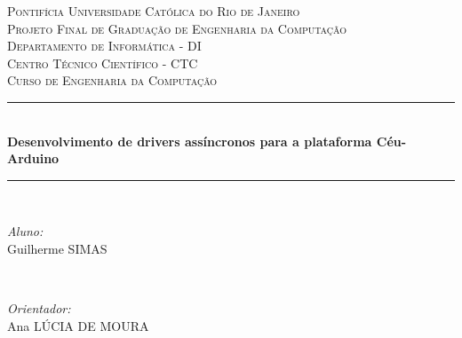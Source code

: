 \documentclass[11pt]{article}
\newcommand\textucsc[1]{\textsc{\MakeUppercase{#1}}}
\begin{document}

\begin{titlepage}

\newcommand{\HRule}{\rule{\linewidth}{0.5mm}} %

\center %
 

\textsc{\LARGE Pontifícia Universidade Católica do Rio de Janeiro}\\[1.5cm] %
\textsc{\Large Projeto Final de Graduação de Engenharia da Computação}\\[0.5cm] %

\textsc{\large Departamento de Informática - DI \\ Centro Técnico Científico - CTC \\ Curso de Engenharia da Computação}\\[0.5cm] %



\newcommand{\titlename}{Desenvolvimento de drivers assíncronos para a plataforma Céu-Arduino}

\HRule \\[0.4cm]
{ \huge \bfseries \titlename}\\[0.4cm] %
\HRule \\[1.5cm]
 

\begin{minipage}{0.4\textwidth}
\begin{flushleft} \large
\emph{Aluno:}\\
Guilherme \textucsc{Simas} %
\end{flushleft}
\end{minipage}
~
\begin{minipage}{0.4\textwidth}
\begin{flushright} \large
\emph{Orientador:} \\
Ana \textucsc{Lúcia de Moura} %
\end{flushright}
\end{minipage}\\[4cm]


\end{titlepage}
\end{document}
